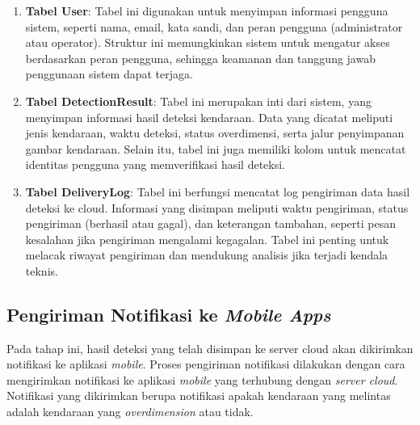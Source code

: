 \begin{enumerate}[nolistsep,label=\textbf{\arabic*.}]

  \item \textbf{Tabel User}: Tabel ini digunakan untuk menyimpan informasi pengguna sistem, seperti nama, email, kata sandi, dan peran pengguna (administrator atau operator). Struktur ini memungkinkan sistem untuk mengatur akses berdasarkan peran pengguna, sehingga keamanan dan tanggung jawab penggunaan sistem dapat terjaga.
  \item \textbf{Tabel DetectionResult}: Tabel ini merupakan inti dari sistem, yang menyimpan informasi hasil deteksi kendaraan. Data yang dicatat meliputi jenis kendaraan, waktu deteksi, status overdimensi, serta jalur penyimpanan gambar kendaraan. Selain itu, tabel ini juga memiliki kolom untuk mencatat identitas pengguna yang memverifikasi hasil deteksi.
  \item \textbf{Tabel DeliveryLog}: Tabel ini berfungsi mencatat log pengiriman data hasil deteksi ke cloud. Informasi yang disimpan meliputi waktu pengiriman, status pengiriman (berhasil atau gagal), dan keterangan tambahan, seperti pesan kesalahan jika pengiriman mengalami kegagalan. Tabel ini penting untuk melacak riwayat pengiriman dan mendukung analisis jika terjadi kendala teknis.
\end{enumerate}

\subsection{Pengiriman Notifikasi ke \emph{Mobile Apps}}

Pada tahap ini, hasil deteksi yang telah disimpan ke server cloud akan dikirimkan notifikasi ke aplikasi \emph{mobile}. Proses pengiriman notifikasi dilakukan dengan cara mengirimkan notifikasi ke aplikasi \emph{mobile} yang terhubung dengan \emph{server cloud}. Notifikasi yang dikirimkan berupa notifikasi apakah kendaraan yang melintas adalah kendaraan yang \emph{overdimension} atau tidak.